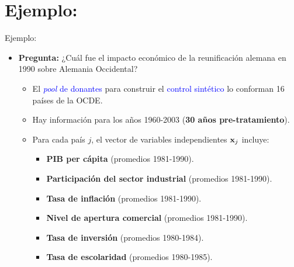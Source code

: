 \documentclass[10pt, xcolor=dvipsnames]{beamer}
\begin{document}
\section[Ejemplo: Abadie et al. (2015)]{Ejemplo: \texorpdfstring{\citet{abadie_comparative_2015}}{Abadie et al. (2015)}}

\begin{frame}{Ejemplo: \texorpdfstring{\citet{abadie_comparative_2015}}{Abadie et al. (2015)}}
\begin{itemize}\setlength{\itemsep}{1em}
    \item \textbf{Pregunta:} ¿Cuál fue el impacto económico de la reunificación alemana en 1990 sobre Alemania Occidental?
    \vspace{0.5em}
    \pause
    \begin{itemize}\setlength{\itemsep}{0.4em}
    \item El \textcolor{blue}{\textit{pool} de donantes} para construir el \textcolor{blue}{control sintético} lo conforman 16 países de la OCDE.    
    \item Hay información para los años 1960-2003 (\textbf{30 años pre-tratamiento}).    
    \pause
    \vspace{0.4em}
    \item Para cada país $j$, el vector de variables independientes $\textbf{x}_j$ incluye:
    \vspace{0.4em}
    \begin{itemize}\setlength{\itemsep}{0.4em}
    \item \textbf{PIB per cápita} (promedios 1981-1990).
    \item \textbf{Participación del sector industrial} (promedios 1981-1990).
    \item \textbf{Tasa de inflación} (promedios 1981-1990).
    \item \textbf{Nivel de apertura comercial} (promedios 1981-1990). 
    \item \textbf{Tasa de inversión} (promedios 1980-1984).
    \item \textbf{Tasa de escolaridad} (promedios 1980-1985).   
    \end{itemize}
    \end{itemize}
\end{itemize}
\end{frame}
\end{document}
